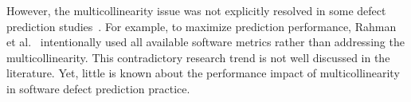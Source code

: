 However, the multicollinearity issue was not explicitly resolved in some defect prediction studies~\cite{Rahman2014ICSEpredictionfinder, Nam2015FSEHDP, Xia2016TSEHydra}. For example, to maximize prediction performance, Rahman et al.~\cite{Rahman2014ICSEpredictionfinder} intentionally used all available software metrics rather than addressing the multicollinearity. This contradictory research trend is not well discussed in the literature.
Yet, little is known about the performance impact of multicollinearity in software defect prediction practice.


